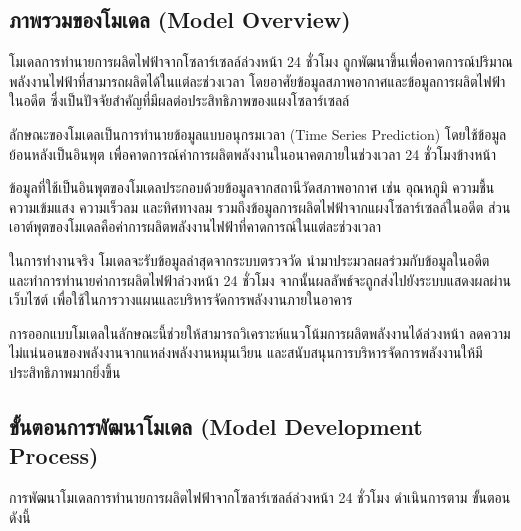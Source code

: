 \subsection{ภาพรวมของโมเดล (Model Overview)}
\hspace{\parindent} โมเดลการทำนายการผลิตไฟฟ้าจากโซลาร์เซลล์ล่วงหน้า 24 ชั่วโมง ถูกพัฒนาขึ้นเพื่อคาดการณ์ปริมาณพลังงานไฟฟ้าที่สามารถผลิตได้ในแต่ละช่วงเวลา โดยอาศัยข้อมูลสภาพอากาศและข้อมูลการผลิตไฟฟ้าในอดีต ซึ่งเป็นปัจจัยสำคัญที่มีผลต่อประสิทธิภาพของแผงโซลาร์เซลล์

ลักษณะของโมเดลเป็นการทำนายข้อมูลแบบอนุกรมเวลา (Time Series Prediction) โดยใช้ข้อมูลย้อนหลังเป็นอินพุต เพื่อคาดการณ์ค่าการผลิตพลังงานในอนาคตภายในช่วงเวลา 24 ชั่วโมงข้างหน้า

ข้อมูลที่ใช้เป็นอินพุตของโมเดลประกอบด้วยข้อมูลจากสถานีวัดสภาพอากาศ เช่น อุณหภูมิ ความชื้น ความเข้มแสง ความเร็วลม และทิศทางลม รวมถึงข้อมูลการผลิตไฟฟ้าจากแผงโซลาร์เซลล์ในอดีต ส่วนเอาต์พุตของโมเดลคือค่าการผลิตพลังงานไฟฟ้าที่คาดการณ์ในแต่ละช่วงเวลา

ในการทำงานจริง โมเดลจะรับข้อมูลล่าสุดจากระบบตรวจวัด นำมาประมวลผลร่วมกับข้อมูลในอดีต และทำการทำนายค่าการผลิตไฟฟ้าล่วงหน้า 24 ชั่วโมง จากนั้นผลลัพธ์จะถูกส่งไปยังระบบแสดงผลผ่านเว็บไซต์ เพื่อใช้ในการวางแผนและบริหารจัดการพลังงานภายในอาคาร

การออกแบบโมเดลในลักษณะนี้ช่วยให้สามารถวิเคราะห์แนวโน้มการผลิตพลังงานได้ล่วงหน้า ลดความไม่แน่นอนของพลังงานจากแหล่งพลังงานหมุนเวียน และสนับสนุนการบริหารจัดการพลังงานให้มีประสิทธิภาพมากยิ่งขึ้น

\subsection{ขั้นตอนการพัฒนาโมเดล (Model Development Process)}
\hspace{\parindent} การพัฒนาโมเดลการทำนายการผลิตไฟฟ้าจากโซลาร์เซลล์ล่วงหน้า 24 ชั่วโมง ดำเนินการตาม ขั้นตอนดังนี้

